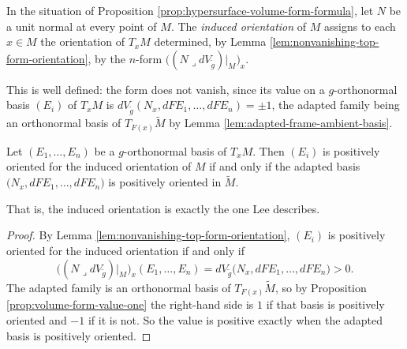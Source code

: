 \begin{definition}
\label{def:induced-orientation}
\leanok
{}
In the situation of Proposition \ref{prop:hypersurface-volume-form-formula}, let $N$ be a unit
normal at every point of $M$. The \emph{induced orientation} of $M$ assigns to each $x \in M$ the
orientation of $T_x M$ determined, by Lemma \ref{lem:nonvanishing-top-form-orientation}, by the
$n$-form $\bigl((N \lrcorner dV_{\tilde g})|_M\bigr)_x$.

This is well defined: the form does not vanish, since its value on a $g$-orthonormal basis
$(E_i)$ of $T_x M$ is $dV_{\tilde g}(N_x, dF E_1, \ldots, dF E_n) = \pm 1$, the adapted family
being an orthonormal basis of $T_{F(x)}\tilde M$ by Lemma
\ref{lem:adapted-frame-ambient-basis}.
\end{definition}

\begin{lemma}
\label{lem:induced-orientation-characterization}
\leanok
{}
Let $(E_1, \ldots, E_n)$ be a $g$-orthonormal basis of $T_x M$. Then $(E_i)$ is positively
oriented for the induced orientation of $M$ if and only if the adapted basis
$\bigl(N_x, dF E_1, \ldots, dF E_n\bigr)$ is positively oriented in $\tilde M$.

That is, the induced orientation is exactly the one Lee describes.
\end{lemma}

\begin{proof}
\leanok
{}
By Lemma \ref{lem:nonvanishing-top-form-orientation}, $(E_i)$ is positively oriented for the
induced orientation if and only if
\[
  \bigl((N \lrcorner dV_{\tilde g})|_M\bigr)_x(E_1, \ldots, E_n)
    = dV_{\tilde g}\bigl(N_x, dF E_1, \ldots, dF E_n\bigr) > 0.
\]
The adapted family is an orthonormal basis of $T_{F(x)}\tilde M$, so by Proposition
\ref{prop:volume-form-value-one} the right-hand side is $1$ if that basis is positively oriented
and $-1$ if it is not. So the value is positive exactly when the adapted basis is positively
oriented.
\end{proof}

